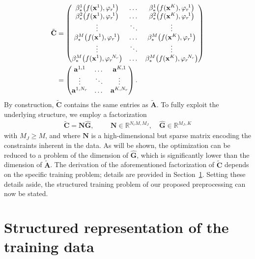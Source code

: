 \documentclass[10pt,a4paper]{amsart}
\newcommand{\Ap}{{\bt{A}}}
\newcommand{\Cp}{{\bt{C}}}
\newcommand{\Nr}{{N_r}}
\newcommand{\R}{\mathbb{R}}
\newcommand{\bt}[1]{{\mathbf{#1}}}
\newcommand{\bv}[1]{{\mathbf #1}}
\newcommand{\fs}[1]{{{#1}}} %
\newcommand{\rom}[1]{{{#1}_{\rm{r}}}}
\newcommand{\tL}{{\fs{\varphi}}}
\newcommand{\vAp}{\bv{a}}
\begin{document}
{\small
\begin{align}
\begin{split}\label{eq:C-data}
\tilde{\Cp} &=
\begin{pmatrix}
\beta_{\rm *}^1\!\left(f(\bv{x}^1), \rom{\tL}^{\!1}\right) & \ldots & \beta_{\rm *}^1\!\left(f(\bv{x}^K), \rom{\tL}^{\!1}\right) \\
\beta_{\rm *}^2\!\left(f(\bv{x}^1), \rom{\tL}^{\!1}\right) & \ldots & \beta_{\rm *}^2\!\left(f(\bv{x}^K), \rom{\tL}^{\!1}\right) \\
\vdots & \ddots & \vdots \\
\beta_{\rm *}^M\!\left(f(\bv{x}^1), \rom{\tL}^{\!1}\right) & \ldots & \beta_{\rm *}^M\!\left(f(\bv{x}^K), \rom{\tL}^{\!1}\right) \\
\vdots & \ddots & \vdots \\
\beta_{\rm *}^M\!\left(f(\bv{x}^1), \rom{\tL}^{\!\Nr}\right) & \ldots & \beta_{\rm *}^M\!\left(f(\bv{x}^K), \rom{\tL}^{\!\Nr}\right)
\end{pmatrix} \\
&=
\begin{pmatrix}
\vAp^{1,1} & \ldots & \vAp^{K,1} \\
\vdots & \ddots & \vdots \\
\vAp^{1,\Nr} & \ldots & \vAp^{K,\Nr}
\end{pmatrix}.
\end{split}
\end{align}
}%
By construction, $\tilde{\Cp}$ contains the same entries as $\tilde{\Ap}$. To fully exploit the underlying structure, we employ a factorization 
\begin{align*}
\tilde{\Cp} = {\bt{N}} \hat{\bt{G}}, \hspace{1cm} \bt{N} \in \R^{N_r M, M_J}, \quad \hat{\bt{G}} \in \R^{M_J,K}
\end{align*}
with $M_J \geq M$, and where $\bt{N}$ is a high-dimensional but sparse matrix encoding the constraints inherent in the data. As will be shown, the optimization can be reduced to a problem of the dimension of $\hat{\bt{G}}$, which is significantly lower than the dimension of $\tilde{\Ap}$. The derivation of the aforementioned factorization of $\tilde{\Cp}$ depends on the specific training problem; details are provided in Section~\ref{sec:separatedData}. Setting these details aside, the structured training problem of our proposed preprocessing can now be stated.

\section{Structured representation of the training data} \label{sec:separatedData}
\end{document}
